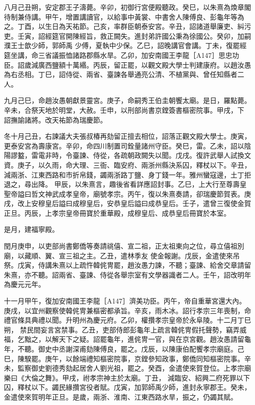 \begin{pinyinscope}
 八月己丑朔，安定郡王子濤薨。辛卯，初御行宮便殿聽政。癸巳，以朱熹為煥章閣待制兼侍講。甲午，增置講讀官，以給事中黃裳、中書舍人陳傅良、彭龜年等為之。丁酉，以生日為天祐節。己亥，率群臣朝泰安宮。辛丑，詔諸道舉廉吏、糾污吏。壬寅，詔經筵官開陳經旨，救正闕失。進封弟許國公秉為徐國公。癸卯，加嗣濮王士歆少師，郭師禹
 少傅，夏執中少保。乙巳，詔晚講官會講。丁未，復罷經筵坐講，命三省議振恤諸路郡縣水旱。乙卯，加安南國王李龍［A147］思忠功臣。詔歲減廣西鹽額十萬緡。丙辰，留正罷，以觀文殿大學士判建康府。以趙汝愚為右丞相。丁巳，詔侍從、兩省、臺諫各舉通亮公清、不植黨與、曾任知縣者二人。



 九月己巳，命趙汝愚朝獻景靈宮。庚子，命嗣秀王伯圭朝饗太廟。是日，羅點薨。辛未，合祭天地於明堂，大赦。壬申，以刑部尚書京鏜簽書樞密院事。甲戌，下
 詔撫諭諸將。改天祐節為瑞慶節。



 冬十月己丑，右諫議大夫張叔椿再劾留正擅去相位，詔落正觀文殿大學士。庚寅，更泰安宮為壽康宮。辛卯，命四川制置司銓量諸州守臣。癸巳，雷。乙未，詔以陰陽謬盭，雷電非時，令臺諫、侍從，各疏朝政闕失以聞。戊戌。復許武舉人試換文資。庚子，以久雨，命大理、三衙、臨安府、兩浙州縣決系囚，釋杖以下。辛丑，減兩浙、江東西路和市折帛錢，蠲兩浙路丁鹽、身丁錢一年。雅州蠻寇邊，土丁拒退之，尋出降。
 甲辰，以朱熹言，趣後省看詳應詔封事。乙巳，上大行至尊壽皇聖帝謚曰哲文神武成孝皇帝，廟號孝宗。丙午，復以朱熹奏請，卻瑞慶節賀表。庚戌，改上安穆皇后謚曰成穆皇后，安恭皇后謚曰成恭皇后。壬子，遣曾三復使金賀正旦。丙辰，上孝宗皇帝冊寶於重華殿，成穆皇后、成恭皇后冊寶於本室。



 是月，建福寧殿。



 閏月庚申，以吏部尚書鄭僑等奏請祧僖、宣二祖，正太祖東向之位，尋立僖祖別廟，以藏順、翼、宣三祖之主。乙丑，遣林季友
 使金報謝。戊辰，金遣使來吊祭。戊寅，侍講朱熹以上疏忤韓侂冑罷，趙汝愚力諫，不聽；臺諫、給舍交章請留朱熹，亦不聽。詔兩省、臺諫、侍從各舉宗室有文學器識者二人。壬午，詔改明年為慶元元年。



 十一月甲午，復加安南國王李龍［A147］濟美功臣。丙午，帝自重華宮還大內。庚戌，以宜州觀察使韓侂冑兼樞密都承旨。辛亥，雨木冰。詔行孝宗三年喪制，命禮官條具典禮以聞。升明州為慶元府。乙卯，權攢孝宗皇帝於永阜陵。十二月丁巳朔，
 禁民間妄言宮禁事。乙丑，吏部侍郎彭龜年上疏言韓侂冑假托聲勢，竊弄威福，乞黜之，以解天下之疑。詔罷龜年，進侂冑一官，與在京宮觀。趙汝愚請留龜年，不聽。御史中丞謝深甫劾陳傅良，罷之。戊辰，以陳康伯配饗孝宗廟庭。己巳，陳騤罷。庚午，以餘端禮知樞密院事，京鏜參知政事，鄭僑同知樞密院事。辛未，監察御史劉德秀劾起居舍人劉光祖，罷之。癸酉，金遣使來賀登位。上孝宗廟樂曰《大倫之舞》。甲戌，祔孝宗神主於太廟。丁丑，
 減臨安、紹興二府死罪以下囚，釋杖以下。蠲民緣攢宮役者賦。戊寅，加郭師禹少師，進封永寧郡王。癸未，金遣使來賀明年正旦。是歲，兩浙、淮南、江東西路水旱，振之，仍蠲其賦。




\end{pinyinscope}

